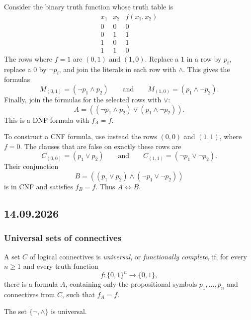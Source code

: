 \documentclass[11pt,a4paper]{amsart}
\begin{document}
\begin{example}
  Consider the binary truth function whose truth table is
  \[
    \begin{array}{cc|c}
      x_1 & x_2 & f(x_1,x_2)\\
      \hline
      0 & 0 & 0\\
      0 & 1 & 1\\
      1 & 0 & 1\\
      1 & 1 & 0
    \end{array}
  \]
  The rows where \(f=1\) are \((0,1)\) and \((1,0)\). Replace a \(1\) in a
  row by \(p_i\), replace a \(0\) by \(\neg p_i\), and join the literals in
  each row with \(\land\). This gives the formulas
  \[
    M_{(0,1)}=(\neg p_1\land p_2)
    \qquad\text{and}\qquad
    M_{(1,0)}=(p_1\land\neg p_2).
  \]
  Finally, join the formulas for the selected rows with \(\lor\):
  \[
    A=((\neg p_1\land p_2)\lor(p_1\land\neg p_2)).
  \]
  This is a DNF formula with \(f_A=f\).

  To construct a CNF formula, use instead the rows \((0,0)\) and \((1,1)\),
  where \(f=0\). The clauses that are false on exactly these rows are
  \[
    C_{(0,0)}=(p_1\lor p_2)
    \qquad\text{and}\qquad
    C_{(1,1)}=(\neg p_1\lor\neg p_2).
  \]
  Their conjunction
  \[
    B=((p_1\lor p_2)\land(\neg p_1\lor\neg p_2))
  \]
  is in CNF and satisfies \(f_B=f\). Thus \(A\Leftrightarrow B\).
\end{example}

\subsection{14.09.2026}

\subsubsection{Universal sets of connectives}

\begin{definition}
  A set \(C\) of logical connectives is \emph{universal}, or
  \emph{functionally complete}, if, for every \(n\geq 1\) and every truth
  function
  \[
    f\colon\{0,1\}^n\longrightarrow\{0,1\},
  \]
  there is a formula \(A\), containing only the propositional symbols
  \(p_1,\ldots,p_n\) and connectives from \(C\), such that \(f_A=f\).
\end{definition}

\begin{theorem}
  The set \(\{\neg,\land\}\) is universal.
\end{theorem}
\end{document}
